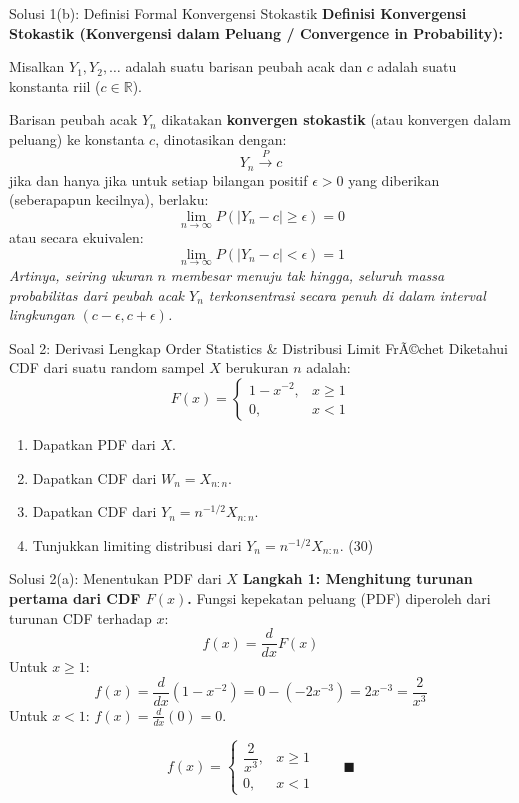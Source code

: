 \documentclass[10pt,twoside]{article}
\begin{document}
\begin{solbox}{Solusi 1(b): Definisi Formal Konvergensi Stokastik}
\textbf{Definisi Konvergensi Stokastik (Konvergensi dalam Peluang / Convergence in Probability):}

Misalkan $Y_1, Y_2, \dots$ adalah suatu barisan peubah acak dan $c$ adalah suatu konstanta riil ($c \in \mathbb{R}$).

Barisan peubah acak $Y_n$ dikatakan \textbf{konvergen stokastik} (atau konvergen dalam peluang) ke konstanta $c$, dinotasikan dengan:
\[
Y_n \xrightarrow{P} c
\]
jika dan hanya jika untuk setiap bilangan positif $\epsilon > 0$ yang diberikan (seberapapun kecilnya), berlaku:
\[
\lim_{n \to \infty} P(|Y_n - c| \ge \epsilon) = 0
\]
atau secara ekuivalen:
\[
\lim_{n \to \infty} P(|Y_n - c| < \epsilon) = 1
\]
\textit{Artinya, seiring ukuran $n$ membesar menuju tak hingga, seluruh massa probabilitas dari peubah acak $Y_n$ terkonsentrasi secara penuh di dalam interval lingkungan $(c - \epsilon, c + \epsilon)$.}
\end{solbox}

\begin{soalbox}{Soal 2: Derivasi Lengkap Order Statistics \& Distribusi Limit FrÃ©chet}
Diketahui CDF dari suatu random sampel $X$ berukuran $n$ adalah:
\[
F(x) = \begin{cases} 1 - x^{-2}, & x \ge 1 \\ 0, & x < 1 \end{cases}
\]
\begin{enumerate}[label=(\alph*)]
  \item Dapatkan PDF dari $X$.
  \item Dapatkan CDF dari $W_n = X_{n:n}$.
  \item Dapatkan CDF dari $Y_n = n^{-1/2} X_{n:n}$.
  \item Tunjukkan limiting distribusi dari $Y_n = n^{-1/2} X_{n:n}$. (30)
\end{enumerate}
\end{soalbox}

\begin{solbox}{Solusi 2(a): Menentukan PDF dari $X$}
\textbf{Langkah 1: Menghitung turunan pertama dari CDF $F(x)$.}
Fungsi kepekatan peluang (PDF) diperoleh dari turunan CDF terhadap $x$:
\[
f(x) = \frac{d}{dx} F(x)
\]
Untuk $x \ge 1$:
\[
f(x) = \frac{d}{dx}\left(1 - x^{-2}\right) = 0 - (-2 x^{-3}) = 2x^{-3} = \frac{2}{x^3}
\]
Untuk $x < 1$: $f(x) = \frac{d}{dx}(0) = 0$.

\[
\boxed{f(x) = \begin{cases} \dfrac{2}{x^3}, & x \ge 1 \\ 0, & x < 1 \end{cases}} \qquad \blacksquare
\]
\end{solbox}
\end{document}
